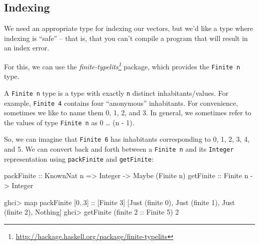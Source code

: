 \documentclass[]{article}
\newenvironment{Shaded}{}{}
\newcommand{\DataTypeTok}[1]{\textcolor[rgb]{0.56,0.13,0.00}{#1}}
\newcommand{\DecValTok}[1]{\textcolor[rgb]{0.25,0.63,0.44}{#1}}
\newcommand{\OtherTok}[1]{\textcolor[rgb]{0.00,0.44,0.13}{#1}}
\newcommand{\FunctionTok}[1]{\textcolor[rgb]{0.02,0.16,0.49}{#1}}
\newcommand{\NormalTok}[1]{#1}
\renewcommand{\href}[2]{#2\footnote{\url{#1}}}
\begin{document}
\subsection{Indexing}\label{indexing}

We need an appropriate type for indexing our vectors, but we'd like a type where
indexing is ``safe'' -- that is, that you can't compile a program that will
result in an index error.

For this, we can use the
\emph{\href{http://hackage.haskell.org/package/finite-typelits}{finite-typelits}}
package, which provides the \texttt{Finite\ n} type.

A \texttt{Finite\ n} type is a type with exactly \texttt{n} distinct
inhabitants/values. For example, \texttt{Finite\ 4} contains four ``anonymous''
inhabitants. For convenience, sometimes we like to name them 0, 1, 2, and 3. In
general, we sometimes refer to the values of type \texttt{Finite\ n} as 0
\ldots{} (n - 1).

So, we can imagine that \texttt{Finite\ 6} has inhabitants corresponding to 0,
1, 2, 3, 4, and 5. We can convert back and forth between a \texttt{Finite\ n}
and its \texttt{Integer} representation using \texttt{packFinite} and
\texttt{getFinite}:

\begin{Shaded}
\begin{Highlighting}[]
\OtherTok{packFinite ::} \DataTypeTok{KnownNat}\NormalTok{ n }\OtherTok{=>} \DataTypeTok{Integer}  \OtherTok{->} \DataTypeTok{Maybe}\NormalTok{ (}\DataTypeTok{Finite}\NormalTok{ n)}
\OtherTok{getFinite  ::}               \DataTypeTok{Finite}\NormalTok{ n }\OtherTok{->} \DataTypeTok{Integer}
\end{Highlighting}
\end{Shaded}

\begin{Shaded}
\begin{Highlighting}[]
\NormalTok{ghci}\FunctionTok{>}\NormalTok{ map packFinite [}\DecValTok{0}\FunctionTok{..}\DecValTok{3}\NormalTok{]}\OtherTok{ ::}\NormalTok{ [}\DataTypeTok{Finite} \DecValTok{3}\NormalTok{]}
\NormalTok{[}\DataTypeTok{Just}\NormalTok{ (finite }\DecValTok{0}\NormalTok{), }\DataTypeTok{Just}\NormalTok{ (finite }\DecValTok{1}\NormalTok{), }\DataTypeTok{Just}\NormalTok{ (finite }\DecValTok{2}\NormalTok{), }\DataTypeTok{Nothing}\NormalTok{]}
\NormalTok{ghci}\FunctionTok{>}\NormalTok{ getFinite (finite }\DecValTok{2}\OtherTok{ ::} \DataTypeTok{Finite} \DecValTok{5}\NormalTok{)}
\DecValTok{2}
\end{Highlighting}
\end{Shaded}
\end{document}
